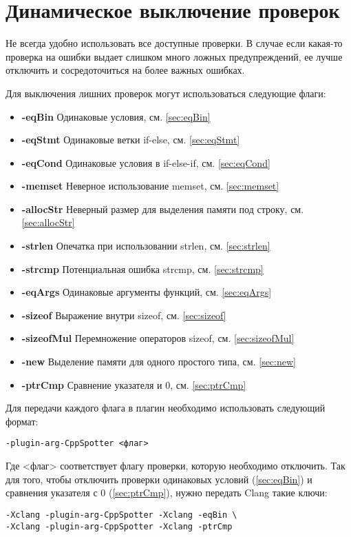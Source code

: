 \section{Динамическое выключение проверок}
Не всегда удобно использовать все доступные проверки. В случае если какая-то проверка на ошибки
выдает слишком много ложных предупреждений, ее лучше отключить и сосредоточиться на более важных
ошибках. 

Для выключения лишних проверок могут использоваться следующие флаги:
\begin{itemize}
	\item \textbf{-eqBin}	Одинаковые условия, см. \ref{sec:eqBin}
	\item \textbf{-eqStmt}	Одинаковые ветки if-else, см. \ref{sec:eqStmt}
	\item \textbf{-eqCond}	Одинаковые условия в if-else-if, см. \ref{sec:eqCond}
	\item \textbf{-memset}	Неверное использование memset, см. \ref{sec:memset}
	\item \textbf{-allocStr}	Неверный размер для выделения памяти под строку, см. \ref{sec:allocStr}
	\item \textbf{-strlen}	Опечатка при использовании strlen, см. \ref{sec:strlen}
	\item \textbf{-strcmp}	Потенциальная ошибка strcmp, см. \ref{sec:strcmp}
	\item \textbf{-eqArgs}	Одинаковые аргументы функций, см. \ref{sec:eqArgs}
	\item \textbf{-sizeof}	Выражение внутри sizeof, см. \ref{sec:sizeof}
	\item \textbf{-sizeofMul}	Перемножение операторов sizeof, см. \ref{sec:sizeofMul}
	\item \textbf{-new}		Выделение памяти для одного простого типа, см. \ref{sec:new}
	\item \textbf{-ptrCmp}	Сравнение указателя и 0, см. \ref{sec:ptrCmp}
\end{itemize}

Для передачи каждого флага в плагин необходимо использовать следующий формат:
\begin{lstlisting}
-plugin-arg-CppSpotter <флаг> 
\end{lstlisting}
Где <флаг> соответствует флагу проверки, которую необходимо отключить.
Так для того, чтобы отключить проверки одинаковых условий (\ref{sec:eqBin}) и сравнения указателя с 0 (\ref{sec:ptrCmp}),
нужно передать Clang такие ключи:
\begin{lstlisting}
-Xclang -plugin-arg-CppSpotter -Xclang -eqBin \ 
-Xclang -plugin-arg-CppSpotter -Xclang -ptrCmp  
\end{lstlisting}

